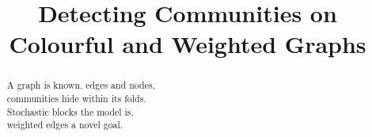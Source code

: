 \documentclass{article}
\begin{document}
\title{Detecting Communities on Colourful and Weighted Graphs}
\maketitle

\begin{abstract}
\centering
\noindent 
A graph is known, edges and nodes, \\
communities hide within its folds. \\
Stochastic blocks the model is, \\
weighted edges a novel goal.
\end{abstract}


\begin{comment}
\section{General Discrete Likelihood}

Let the parameter space be the following:

\[
\Theta(\sigma, n, K, P, Q) = \{
   \sigma: [n] \rightarrow K, \, P, Q \textrm{ distributions} \}
\]

The graph adjacency matrix is generated as such:
\[
\begin{array}{cc}
A_{ij} \sim P & \trm{if } \sigma(i) = \sigma(j) \\
A_{ij} \sim Q & \trm{if } \sigma(i) \neq \sigma(j) 
\end{array}
\]

Suppose $P, Q$ are known, the likelihood function becomes:
\[
L(\sigma) = \sum_{i<j} \log P(A_{ij}) \mathbf{1}_{\sigma(i) = \sigma(j)} + 
  \sum_{i<j} \log Q(A_{ij}) \mathbf{1}_{\sigma(i) \neq \sigma(j)}
\]
Since $1 - \mathbf{1}_{sigma(i) \neq \sigma(j)} = \mathbf{1}_{\sigma(i) = \sigma(j)}$, we have that
\begin{align*}
L(\sigma) = \sum_{i<j} \log \frac{P(A_{ij})}{Q(A_{ij})} \mathbf{1}_{\sigma(i) = \sigma(j)} + \sum_{i<j} \log Q(A_{ij})
\end{align*}
We can safely discard the second term since it is a constant for any $\sigma$. We turn to the case where $P,Q$ are general discrete distributions with domain size $L$. It is straightforward to see that
\[
\begin{array}{cc}
\log P(A_{ij}) = & \sum_{l=1}^L \mathbf{1}_{A_{ij} = l} \log P_l \\
\log Q(A_{ij}) = & \sum_{l=1}^L \mathbf{1}_{A_{ij} = l} \log Q_l
\end{array}
\]
The same summation form similarly holds for $\log \frac{P(A_{ij})}{Q(A_{ij})}$. 


\end{comment}
\end{document}

